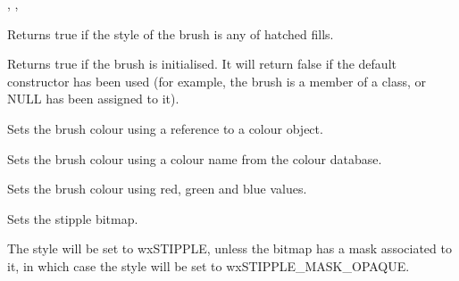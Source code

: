 
, ,\rtfsp
{}


\label{wxbrushishatch}


Returns true if the style of the brush is any of hatched fills.




\label{wxbrushisok}


Returns true if the brush is initialised. It will return false if the default
constructor has been used (for example, the brush is a member of a class, or
NULL has been assigned to it).


\label{wxbrushsetcolour}


Sets the brush colour using a reference to a colour object.


Sets the brush colour using a colour name from the colour database.


Sets the brush colour using red, green and blue values.




\label{wxbrushsetstipple}


Sets the stipple bitmap.




The style will be set to wxSTIPPLE, unless the bitmap has a mask associated
to it, in which case the style will be set to wxSTIPPLE\_MASK\_OPAQUE.

